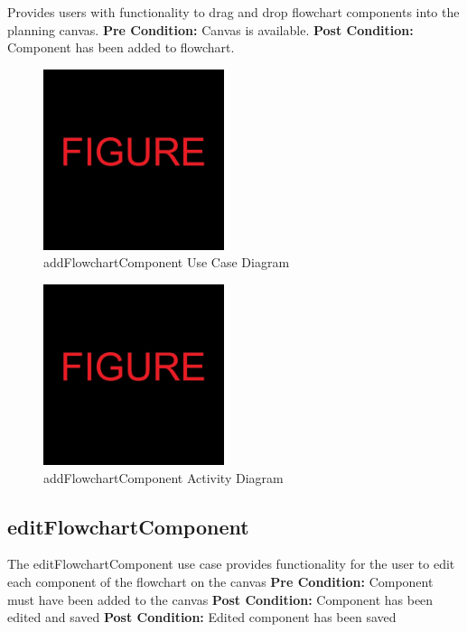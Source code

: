 \documentclass[11pt,a4paper,titlepage]{article}
\begin{document}
Provides users with functionality to drag and drop flowchart components into the planning canvas.\newline\newline
\textbf{Pre Condition:} Canvas is available.\newline\newline
\textbf{Post Condition:} Component has been added to flowchart.

\begin{figure}[H]
  \centering
\includegraphics[width=200px]{figure.jpg}
\caption{addFlowchartComponent Use Case Diagram}
\end{figure}

\begin{figure}[H]
  \centering
\includegraphics[width=200px]{figure.jpg}
\caption{addFlowchartComponent Activity Diagram}
\end{figure}

\newpage
\subsection{editFlowchartComponent}

The editFlowchartComponent use case provides functionality for the user to edit each component of the flowchart on the canvas \newline\newline
\textbf{Pre Condition:} Component must have been added to the canvas\newline\newline
\textbf{Post Condition:} Component has been edited and saved\newline
\textbf{Post Condition:} Edited component has been saved
\end{document}
